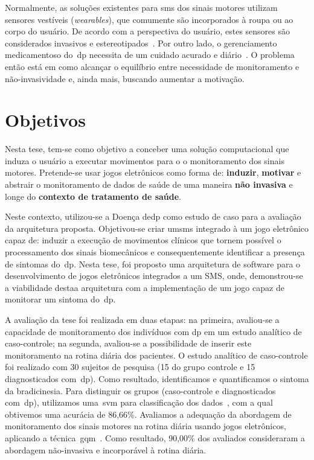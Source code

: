Normalmente, as soluções existentes para \ac{sms} dos sinais motores utilizam sensores vestíveis (\textit{wearables}), que comumente são incorporados à roupa ou ao corpo do usuário. De acordo com a perspectiva do usuário, estes sensores são considerados invasivos e estereotipados~\cite{aarhus_negotiating_2010}. Por outro lado, o gerenciamento medicamentoso do~\ac{dp} necessita de um cuidado acurado e diário~\cite{quantitativeparkinson2011}. O problema então está em como alcançar o equilíbrio entre necessidade de monitoramento e não-invasividade e, ainda mais, buscando aumentar a motivação.

\section{Objetivos}\label{section:objetivos}
Nesta tese, tem-se como objetivo a conceber uma solução computacional que induza o usuário a executar movimentos para o o monitoramento dos sinais motores. Pretende-se usar jogos eletrônicos como forma de: \textbf{induzir}, \textbf{motivar} e abstrair o monitoramento de dados de saúde de uma maneira \textbf{não invasiva} e longe do \textbf{contexto de tratamento de saúde}.

Neste contexto, utilizou-se a Doença de\ac{dp} como estudo de caso para a avaliação da arquitetura proposta. Objetivou-se criar um\ac{sms} integrado à um jogo eletrônico capaz de: induzir a execução de movimentos clínicos que tornem possível o processamento dos sinais biomecânicos e consequentemente identificar a presença de sintomas do~\ac{dp}. Nesta tese, foi proposto uma arquitetura de software para o desenvolvimento de jogos eletrônicos integrados a um SMS, onde, demonstrou-se a viabilidade destaa arquitetura com a implementação de um jogo capaz de monitorar um sintoma do~\ac{dp}.

A avaliação da tese foi realizada em duas etapas: na primeira, avaliou-se a capacidade de monitoramento dos indivíduos com \ac{dp} em um estudo analítico de caso-controle; na segunda, avaliou-se a possibilidade de inserir este monitoramento na rotina diária dos pacientes. O estudo analítico de caso-controle foi realizado com 30 sujeitos de pesquisa (15 do grupo controle e 15 diagnosticados com~\ac{dp}). Como resultado, identificamos e quantificamos o sintoma da bradicinesia. Para distinguir os grupos (caso-controle e diagnosticados com~\ac{dp}), utilizamos uma~\ac{svm} para classificação dos dados~\cite{datamining2005}, com a qual obtivemos uma acurácia de 86,66\%. Avaliamos a adequação da abordagem de monitoramento dos sinais motores na rotina diária usando jogos eletrônicos, aplicando a técnica~\ac{gqm}~\cite{van1999goal}. Como resultado, 90,00\% dos avaliados consideraram a abordagem não-invasiva e incorporável à rotina diária. 

